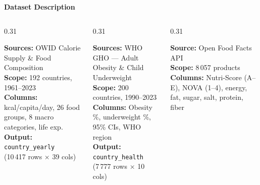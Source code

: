 \documentclass[aspectratio=169, 10pt]{beamer}
\begin{document}
\begin{frame}
\begin{center}
  {\large\bfseries\textcolor{NDarkGreen}{Dataset Description}}
\end{center}
\vspace{-4pt}
\begin{columns}[T]
  \begin{column}{0.31\textwidth}
    \begin{tcolorbox}[ybox, title={\scriptsize\bfseries Q1: What does the world eat?},
      coltitle=NBrown, colbacktitle=NYellow!35]
      \scriptsize
      \textbf{Sources:} OWID Calorie Supply \& Food Composition\\[1pt]
      \textbf{Scope:} 192 countries, 1961--2023\\[1pt]
      \textbf{Columns:} kcal/capita/day, 26 food groups, 8 macro categories, life exp.\\[1pt]
      \textbf{Output:} \texttt{country\_yearly}\\(10\,417 rows $\times$ 39 cols)
    \end{tcolorbox}
  \end{column}
  \begin{column}{0.31\textwidth}
    \begin{tcolorbox}[gbox, title={\scriptsize\bfseries Q2: How healthy is it?},
      coltitle=white, colbacktitle=NGreen]
      \scriptsize
      \textbf{Sources:} WHO GHO --- Adult Obesity \& Child Underweight\\[1pt]
      \textbf{Scope:} 200 countries, 1990--2023\\[1pt]
      \textbf{Columns:} Obesity \%, underweight \%, 95\% CIs, WHO region\\[1pt]
      \textbf{Output:} \texttt{country\_health}\\(7\,777 rows $\times$ 10 cols)
    \end{tcolorbox}
  \end{column}
  \begin{column}{0.31\textwidth}
    \begin{tcolorbox}[obox, title={\scriptsize\bfseries Q3: What's in our food?},
      coltitle=white, colbacktitle=NOrange]
      \scriptsize
      \textbf{Source:} Open Food Facts API\\[1pt]
      \textbf{Scope:} 8\,057 products\\[1pt]
      \textbf{Columns:} Nutri-Score (A--E), NOVA (1--4), energy, fat, sugar, salt, protein, fiber\\[1pt]

\end{tcolorbox}
\end{column}
\end{columns}
\end{frame}
\end{document}
